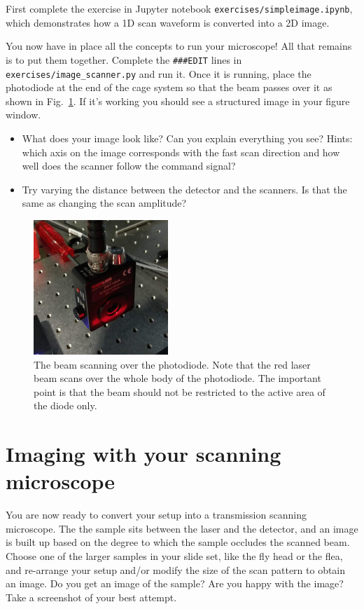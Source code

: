 \documentclass[a4paper]{report}
\begin{document}
First complete the exercise in Jupyter notebook \texttt{exercises/simpleimage.ipynb}, which demonstrates how a 1D scan waveform is converted into a 2D image. 
\vspace{0.5em}

\noindent
You now have in place all the concepts to run your microscope! 
All that remains is to put them together. 
Complete the \texttt{###EDIT} lines in \texttt{exercises/image\_scanner.py} and run it. 
Once it is running, place the photodiode at the end of the cage system so that the beam passes over it as shown in Fig.~\ref{lineOnPD}.
If it's working you should see a structured image in your figure window.

\begin{itemize}
    \item What does your image look like? Can you explain everything you see? Hints: which axis on the image corresponds with the fast scan direction and how well does the scanner follow the command signal?
    \item Try varying the distance between the detector and the scanners. Is that the same as changing the scan amplitude?
\end{itemize}

\begin{figure}[h]
\centering
\includegraphics[width=2.0in]{BeamScanningOverPhotoDiode.png}
\caption{The beam scanning over the photodiode. 
         Note that the red laser beam scans over the whole body of the photodiode. 
         The important point is that the beam should not be restricted to the active area of the diode only.}
\label{lineOnPD}
\end{figure}


\clearpage

\section{Imaging with your scanning microscope}
You are now ready to convert your setup into a transmission scanning microscope.
The the sample sits between the laser and the detector, and an image is built up based on the degree to which the sample occludes the scanned beam. 
Choose one of the larger samples in your slide set, like the fly head or the flea, and re-arrange your setup and/or modify the size of the scan pattern to obtain an image. 
Do you get an image of the sample? 
Are you happy with the image?
Take a screenshot of your best attempt.
\vspace{0.5em}
\end{document}

